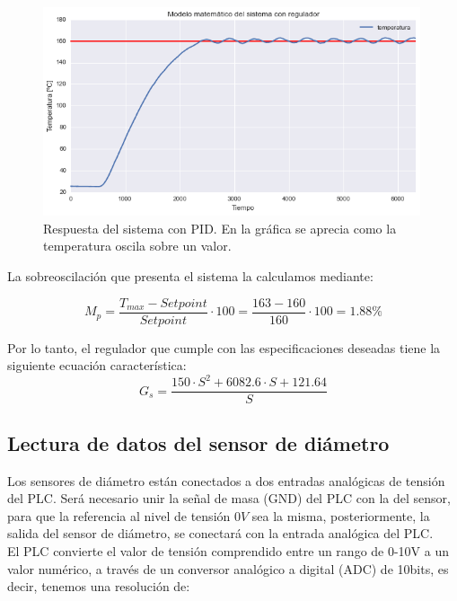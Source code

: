 \begin{figure}[H]
    \centering
    \includegraphics[width=0.99\textwidth]{images/PLC/modelado/modelado_38_1.png}
    \caption[Respuesta del sistema con PID.]{Respuesta del sistema con PID. En la gráfica se aprecia como la temperatura oscila sobre un valor.}
    \label{fig:plc_PID4}
\end{figure}

La sobreoscilación que presenta el sistema la calculamos mediante:

\begin{equation}
M_{p}=\frac{T_{max}-Setpoint}{Setpoint} \cdot 100 = \frac{163-160}{160} \cdot 100 = 1.88\%
\end{equation}

Por lo tanto, el regulador que cumple con las especificaciones deseadas tiene la siguiente ecuación característica:
\begin{equation}
G_s = \frac{150 \cdot S^2 + 6082.6 \cdot S + 121.64}{S}
\end{equation}


\subsection{Lectura de datos del sensor de diámetro}
\label{sec:plc_diametro}

Los sensores de diámetro están conectados a dos entradas analógicas de tensión del PLC. Será necesario unir la señal de masa (GND) del PLC con la del sensor, para que la referencia al nivel de tensión $0 V$ sea la misma, posteriormente, la salida del sensor de diámetro, se conectará con la entrada analógica del PLC.\\

El PLC convierte el valor de tensión comprendido entre un rango de 0-10V a un valor numérico, a través de un conversor analógico a digital (ADC) de 10bits, es decir, tenemos una resolución de:


